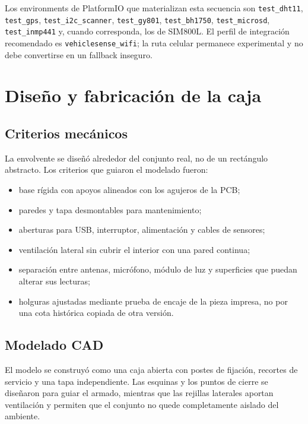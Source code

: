 \documentclass[11pt,a4paper,oneside]{report}
\newcommand{\codigo}[1]{\texttt{\small #1}}
\begin{document}
Los environments de PlatformIO que materializan esta secuencia son
\codigo{test\_dht11}, \codigo{test\_gps}, \codigo{test\_i2c\_scanner},
\codigo{test\_gy801}, \codigo{test\_bh1750}, \codigo{test\_microsd},
\codigo{test\_inmp441} y, cuando corresponda, los de SIM800L. El perfil de
integración recomendado es \codigo{vehiclesense\_wifi}; la ruta celular permanece
experimental y no debe convertirse en un fallback inseguro.

\chapter{Diseño y fabricación de la caja}

\section{Criterios mecánicos}

La envolvente se diseñó alrededor del conjunto real, no de un rectángulo abstracto.
Los criterios que guiaron el modelado fueron:

\begin{itemize}
  \item base rígida con apoyos alineados con los agujeros de la PCB;
  \item paredes y tapa desmontables para mantenimiento;
  \item aberturas para USB, interruptor, alimentación y cables de sensores;
  \item ventilación lateral sin cubrir el interior con una pared continua;
  \item separación entre antenas, micrófono, módulo de luz y superficies que puedan
        alterar sus lecturas;
  \item holguras ajustadas mediante prueba de encaje de la pieza impresa, no por
        una cota histórica copiada de otra versión.
\end{itemize}

\section{Modelado CAD}

El modelo se construyó como una caja abierta con postes de fijación, recortes de
servicio y una tapa independiente. Las esquinas y los puntos de cierre se diseñaron
para guiar el armado, mientras que las rejillas laterales aportan ventilación y
permiten que el conjunto no quede completamente aislado del ambiente.
\end{document}
